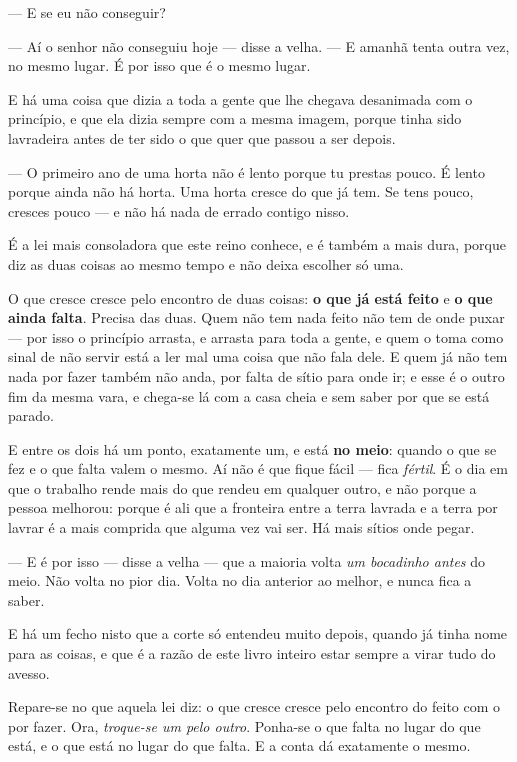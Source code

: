 \documentclass[livro.tex]{subfiles}
\begin{document}
--- E se eu não conseguir?

--- Aí o senhor não conseguiu hoje --- disse a velha. --- E amanhã tenta outra vez, no mesmo
lugar. É por isso que é o mesmo lugar.

\medskip

E há uma coisa que \Qui dizia a toda a gente que lhe chegava desanimada com o princípio, e
que ela dizia sempre com a mesma imagem, porque tinha sido lavradeira antes de ter sido o
que quer que passou a ser depois.

--- O primeiro ano de uma horta não é lento porque tu prestas pouco. É lento porque ainda
não há horta. Uma horta cresce do que já tem. Se tens pouco, cresces pouco --- e não há
nada de errado contigo nisso.

\medskip

É a lei mais consoladora que este reino conhece, e é também a mais dura, porque diz as duas
coisas ao mesmo tempo e não deixa escolher só uma.

O que cresce cresce pelo encontro de duas coisas: \textbf{o que já está feito} e \textbf{o
que ainda falta}. Precisa das duas. Quem não tem nada feito não tem de onde puxar --- por
isso o princípio arrasta, e arrasta para toda a gente, e quem o toma como sinal de não
servir está a ler mal uma coisa que não fala dele. E quem já não tem nada por fazer também
não anda, por falta de sítio para onde ir; e esse é o outro fim da mesma vara, e chega-se
lá com a casa cheia e sem saber por que se está parado.

E entre os dois há um ponto, exatamente um, e está \textbf{no meio}: quando o que se fez e
o que falta valem o mesmo. Aí não é que fique fácil --- fica \emph{fértil}. É o dia em que
o trabalho rende mais do que rendeu em qualquer outro, e não porque a pessoa melhorou:
porque é ali que a fronteira entre a terra lavrada e a terra por lavrar é a mais comprida
que alguma vez vai ser. Há mais sítios onde pegar.

\medskip

--- E é por isso --- disse a velha --- que a maioria volta \emph{um bocadinho antes} do
meio. Não volta no pior dia. Volta no dia anterior ao melhor, e nunca fica a saber.

\medskip

E há um fecho nisto que a corte só entendeu muito depois, quando já tinha nome para as
coisas, e que é a razão de este livro inteiro estar sempre a virar tudo do avesso.

Repare-se no que aquela lei diz: o que cresce cresce pelo encontro do feito com o por
fazer. Ora, \emph{troque-se um pelo outro}. Ponha-se o que falta no lugar do que está, e o
que está no lugar do que falta. E a conta dá exatamente o mesmo.
\end{document}
